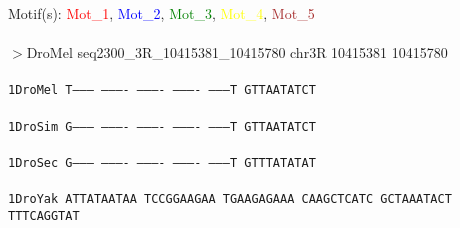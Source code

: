 \documentclass[11pt,twoside,reqno,a4paper]{article}
\begin{document}
\noindent
\newlength{\charwidth}Motif(s): \textcolor{Red}{Mot\_1}, \textcolor{Blue}{Mot\_2}, \textcolor{Green}{Mot\_3}, \textcolor{Yellow}{Mot\_4}, \textcolor{Brown}{Mot\_5}\\
\\
$>$DroMel	seq2300\_3R\_10415381\_10415780	chr3R	10415381	10415780 \\
 \\
\texttt{1\hspace*{3\charwidth}DroMel	T---------	----------	----------	----------	---------T	GTTAATATCT	\\
\hspace*{4\charwidth}\hspace*{7\charwidth}\hspace*{1\charwidth}\hspace*{1\charwidth}\hspace*{1\charwidth}\hspace*{1\charwidth}\hspace*{1\charwidth}\hspace*{1\charwidth}\\
1\hspace*{3\charwidth}DroSim	G---------	----------	----------	----------	---------T	GTTAATATCT	\\
\hspace*{4\charwidth}\hspace*{7\charwidth}\hspace*{1\charwidth}\hspace*{1\charwidth}\hspace*{1\charwidth}\hspace*{1\charwidth}\hspace*{1\charwidth}\hspace*{1\charwidth}\\
1\hspace*{3\charwidth}DroSec	G---------	----------	----------	----------	---------T	GTTTATATAT	\\
\hspace*{4\charwidth}\hspace*{7\charwidth}\hspace*{1\charwidth}\hspace*{1\charwidth}\hspace*{1\charwidth}\hspace*{1\charwidth}\hspace*{1\charwidth}\hspace*{1\charwidth}\\
1\hspace*{3\charwidth}DroYak	ATTATAATAA	TCCGGAAGAA	TGAAGAGAAA	CAAGCTCATC	GCTAAATACT	TTTCAGGTAT	\\
}
\end{document}
